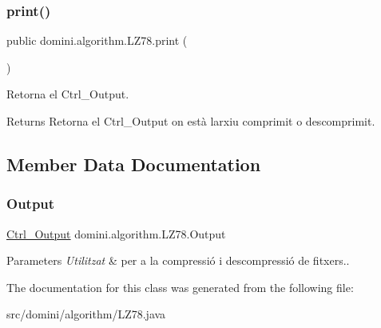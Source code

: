 \subsubsection{\texorpdfstring{print()}{print()}}
{\footnotesize\ttfamily public domini.\+algorithm.\+L\+Z78.\+print (\begin{DoxyParamCaption}{ }\end{DoxyParamCaption})\hspace{0.3cm}{\ttfamily [inline]}}



Retorna el Ctrl\+\_\+\+Output. 

\begin{DoxyReturn}{Returns}
Retorna el Ctrl\+\_\+\+Output on està l\textquotesingle{}arxiu comprimit o descomprimit. 
\end{DoxyReturn}


\subsection{Member Data Documentation}
\mbox{\label{classdomini_1_1algorithm_1_1LZ78_a6cb1fa950644b379cc4034437047ccb8}} 
\subsubsection{\texorpdfstring{Output}{Output}}
{\footnotesize\ttfamily \hyperlink{classpersistencia_1_1output_1_1Ctrl__Output}{Ctrl\+\_\+\+Output} domini.\+algorithm.\+L\+Z78.\+Output\hspace{0.3cm}{\ttfamily [package]}}


\begin{DoxyParams}{Parameters}
{\em Utilitzat} & per a la compressió i descompressió de fitxers.. \\
\hline
\end{DoxyParams}


The documentation for this class was generated from the following file\+:\begin{DoxyCompactItemize}
\item 
src/domini/algorithm/L\+Z78.\+java\end{DoxyCompactItemize}
